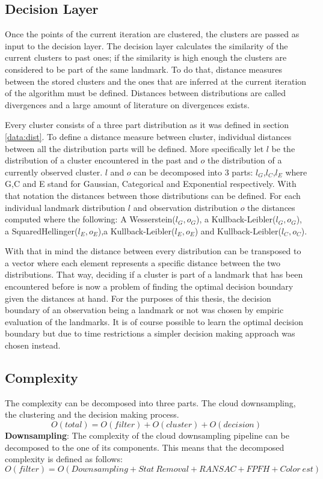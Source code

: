 \documentclass[twoside,hidelinks]{article}
\begin{document}
\subsection{Decision Layer}

Once the points of the current iteration are clustered, the clusters are passed as input to the decision layer. The decision layer calculates the similarity of the current clusters to past ones; if the similarity is high enough the clusters are considered to be part of the same landmark. To do that, distance measures between the stored clusters and the ones that are inferred at the current iteration of the algorithm must be defined. Distances between distributions are called divergences and a large amount of literature on divergences exists.

Every cluster consists of a three part distribution as it was defined in section \ref{data:dist}. To define a distance measure between cluster, individual distances between all the distribution parts will be defined. More specifically let $l$ be the distribution of a cluster encountered in the past and $o$ the distribution of a currently observed cluster. $l$ and $o$ can be decomposed into 3 parts: $l_G$,$l_C$,$l_E$ where G,C and E stand for Gaussian, Categorical and Exponential respectively. With that notation the distances between those distributions can be defined. For each individual landmark distribution $l$ and observation distribution $o$ the distances computed where the following: A Wesserstein($l_G,o_G$), a Kullback-Leibler($l_G,o_G$), a SquaredHellinger($l_E,o_E$),a Kullback-Leibler($l_E,o_E$) and  Kullback-Leibler($l_C,o_C$).

With that in mind the distance between every distribution can be transposed to a vector where each element represents a specific distance between the two distributions. That way, deciding if a cluster is part of a landmark that has been encountered before is now a problem of finding the optimal decision boundary given the distances at hand. For the purposes of this thesis, the decision boundary of an observation being a landmark or not was chosen by empiric evaluation of the landmarks. It is of course possible to learn the optimal decision boundary but due to time restrictions a simpler decision making approach was chosen instead.

\subsection{Complexity}
\label{subsec:complexity}
The complexity can be decomposed into three parts. The cloud downsampling, the clustering and the decision making process.
$$
O(total) = O(filter) + O(cluster) + O(decision)
$$
\textbf{Downsampling}: The complexity of the cloud downsampling pipeline can be decomposed to the one of its components. This means that the decomposed complexity is defined as follows:
$$O(filter) = O(Downsampling + Stat\ Removal + RANSAC+ FPFH + Color\ est) $$
\end{document}

